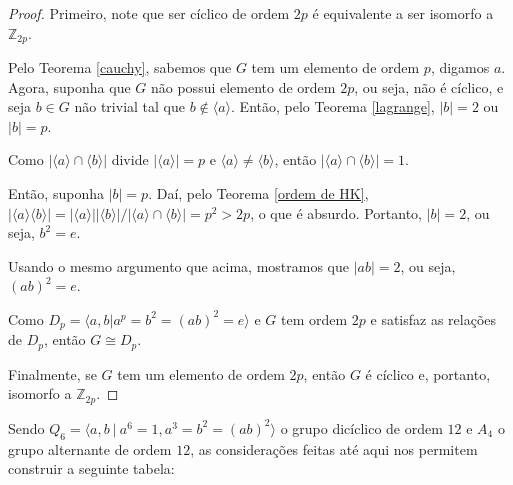 	\begin{proof}
		Primeiro, note que ser cíclico de ordem $2p$ é equivalente a ser isomorfo a $\mathbb{Z}_{2p}$.
		
		\par\vspace{0.3cm} Pelo Teorema \ref{cauchy}, sabemos que $G$ tem um elemento de ordem $p$, 
		digamos $a$. Agora, suponha que $G$ não possui elemento de ordem $2p$, ou seja, não é cíclico, 
		e seja $b\in G$ não trivial tal que $b\notin\langle a \rangle$. Então, pelo 
		Teorema \ref{lagrange}, $|b|=2$ ou $|b|=p$. 
		
		\par\vspace{0.3cm} Como $|\langle a \rangle \cap \langle b \rangle|$ divide 
		$|\langle a \rangle|=p$ e $\langle a \rangle\neq\langle b \rangle$, então 
		$|\langle a \rangle \cap \langle b \rangle|=1$. 
		
		\par\vspace{0.3cm} Então, suponha $|b|=p$. Daí, pelo Teorema \ref{ordem de HK},	
		$|\langle a \rangle \langle b \rangle| = |\langle a\rangle||\langle b\rangle|/
		|\langle a\rangle\cap \langle b \rangle|=p^2>2p$, o que é absurdo. 
		Portanto, $|b|=2$, ou seja, $b^2 = e$.
		
		\par\vspace{0.3cm} Usando o mesmo argumento que acima, mostramos que $|ab|=2$, ou seja, $(ab)^2 = e$. 
		
		\par\vspace{0.3cm} Como $D_p=\langle a,b|a^p=b^2=(ab)^2=e\rangle$ e $G$ tem ordem $2p$ e 
		satisfaz as relações de $D_p$, então $G\cong D_p$.
		
		\par\vspace{0.3cm} Finalmente, se $G$ tem um elemento de ordem $2p$, então $G$ é cíclico 
		e, portanto, isomorfo a $\mathbb{Z}_{2p}$.
	\end{proof}
	Sendo $Q_6 = \langle a,b \ | \ a^6=1, a^3=b^2=(ab)^2 \rangle$ o grupo dicíclico 
	de ordem $12$ e $A_4$ o grupo alternante de ordem $12$, as considerações feitas
	até aqui nos permitem construir a seguinte tabela:
